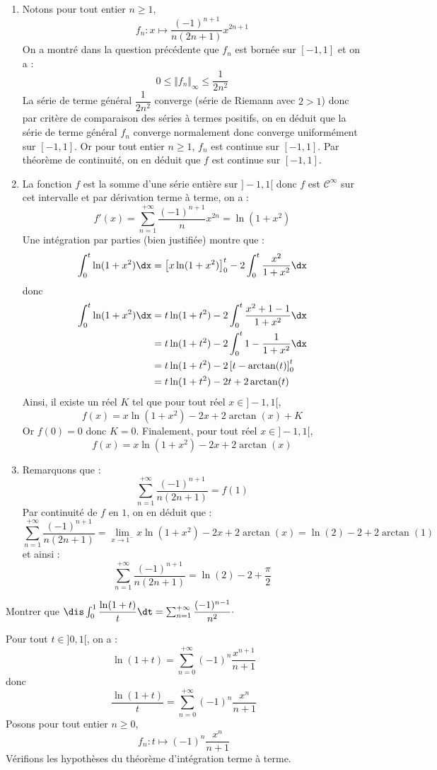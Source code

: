 \documentclass[a4paper,10pt]{report}
\begin{document}
\begin{enumerate}
\item Notons pour tout entier $n \geq 1$,
$$ f_n : x \mapsto \dfrac{(-1)^{n+1}}{n(2n+1)} x^{2n+1}$$
On a montré dans la question précédente que $f_n$ est bornée sur $[-1,1]$ et on a :
$$ 0 \leq \Vert f_n \Vert_{\infty} \leq  \dfrac{1}{2n^2}$$
La série de terme général $\dfrac{1}{2n^2}$ converge (série de Riemann avec $2>1$) donc par critère de comparaison des séries à termes positifs, on en déduit que la série de terme général $f_n$ converge normalement donc converge uniformément sur $[-1,1]$. Or pour tout entier $n \geq 1$, $f_n$ est continue sur $[-1,1]$. Par théorème de continuité, on en déduit que $f$ est continue sur $[-1,1]$.
\item La fonction $f$ est la somme d'une série entière sur $]-1,1[$ donc $f$ est $\mathcal{C}^{\infty}$ sur cet intervalle et par dérivation terme à terme, on a :
$$ f'(x) = \sum_{n=1}^{+ \infty}  \dfrac{(-1)^{n+1}}{n} x^{2n} = \ln(1+x^2)$$
Une intégration par parties (bien justifiée) montre que :
$$ \int_0^{t} \ln(1+x^2) \dx = \left[ x \ln(1+x^2) \right]_0^t - 2\int_0^t \dfrac{x^2}{1+x^2} \dx$$
donc 
\begin{align*}
 \int_0^{t} \ln(1+x^2) \dx & =  t \ln(1+t^2)  - 2\int_0^t \dfrac{x^2+1-1}{1+x^2} \dx \\
 & = t \ln(1+t^2)  - 2\int_0^t 1 - \dfrac{1}{1+x^2} \dx \\
 & = t \ln(1+t^2) - 2 \left[ t - \arctan(t) \right]_0^t \\
 & = t \ln(1+t^2) - 2t + 2 \arctan(t)
\end{align*}
Ainsi, il existe un réel $K$ tel que pour tout réel $x \in ]-1,1[$,
$$ f(x) = x \ln(1+x^2) - 2x + 2 \arctan(x) + K$$
Or $f(0)=0$ donc $K=0$. Finalement, pour tout réel $x \in ]-1,1[$,
$$ f(x) = x \ln(1+x^2) - 2x + 2 \arctan(x) $$
\item Remarquons que :
$$ \sum_{n=1}^{+ \infty} \dfrac{(-1)^{n+1}}{n(2n+1)}  = f(1)$$
Par continuité de $f$ en $1$, on en déduit que :
$$ \sum_{n=1}^{+ \infty} \dfrac{(-1)^{n+1}}{n(2n+1)} = \lim_{x \rightarrow 1^{-}}  x \ln(1+x^2) - 2x + 2 \arctan(x) =\ln(2)-2+ 2 \arctan(1)$$
et ainsi :
$$ \sum_{n=1}^{+ \infty} \dfrac{(-1)^{n+1}}{n(2n+1)} = \ln(2)-2 + \dfrac{\pi}{2}$$
\end{enumerate}

\begin{Exa} Montrer que $\dis \int_{0}^1 \dfrac{\ln(1+t)}{t}\dt = \sum_{n=1}^{+ \infty} \dfrac{(-1)^{n-1}}{n^2} \cdot$
\end{Exa}

\corr Pour tout $t \in ]0,1[$, on a :
$$ \ln(1+t) = \sum_{n=0}^{+ \infty} (-1)^{n} \dfrac{x^{n+1}}{n+1}$$
donc
$$ \dfrac{\ln(1+t)}{t} = \sum_{n=0}^{+ \infty} (-1)^{n} \dfrac{x^{n}}{n+1}$$
Posons pour tout entier $n \geq 0$,
$$ f_n : t \mapsto (-1)^{n} \dfrac{x^{n}}{n+1}$$
Vérifions les hypothèses du théorème d'intégration terme à terme.
\end{document}
